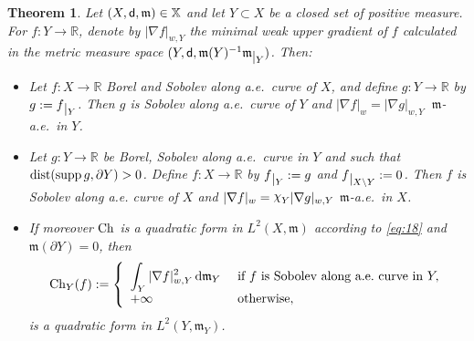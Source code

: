 \documentclass[reqno,11pt]{article}
\numberwithin{equation}{section}
\newcommand{\C}{\mathbb{C}}
\newcommand{\R}{\mathbb{R}}
\newcommand{\mm}{{\mbox{\boldmath$m$}}}
\newcommand{\sfd}{{\sf d}}
\newcommand{\supp}{\mathop{\rm supp}\nolimits}   %
\renewcommand{\d}{{\mathrm d}}
\newcommand{\restr}[1]{\lower3pt\hbox{$|_{#1}$}}
\newcommand{\nchi}{{\raise.3ex\hbox{$\chi$}}}
\newtheorem{theorem}{Theorem}[section]
\newcommand{\X}{\mathbb X}
\newcommand{\weakgrad}[1]{|\nabla #1|_w}                %
\renewcommand{\C}{{\rm Ch}}
\newcommand{\weakgrado}[2]{|\nabla #1|_{w,#2}}                %
\renewcommand{\mm}{\mathfrak m}
\begin{document}
\begin{theorem}\label{thm:gradristretti}
Let $(X,\sfd,\mm)\in \X$ and let $Y\subset X$ be a closed set of
positive measure. For $f:Y\to\R$, denote by $\weakgrado f{Y}$ the
minimal weak upper gradient of $f$ calculated in the metric measure
space $(Y,\sfd,\mm(Y)^{-1}\mm\restr{Y})$. Then:
\begin{itemize}
\item[(i)] Let $f: X\to\R$ Borel and Sobolev along a.e.~curve of $X$, and define $g:Y\to\R$ by
$g:=f\restr{Y}$. Then $g$ is Sobolev along a.e.~curve of $Y$ and
$\weakgrad f=\weakgrado{g}{Y}\ $ $\mm$-a.e.~in $Y$.
\item[(ii)] Let $g:Y\to\R$ be Borel, Sobolev along a.e.~curve in $Y$ and such that
${\rm dist}(\supp g,\partial Y)>0$. Define $f:X\to\R$ by $f\restr
Y:=g$ and $f\restr{X\setminus Y}:=0$. Then $f$ is Sobolev along a.e.
curve of $X$ and $\weakgrad f=\nchi_Y\weakgrado {g}Y$ $\mm$-a.e.~in
$X$.
\item[(iii)] If moreover $\C$ is a quadratic form in $L^2(X,\mm)$ according to
\eqref{eq:18} and $\mm(\partial Y)=0$, then
\[
\C_Y(f):=\left\{\begin{array}{ll}
\displaystyle{\int_Y\weakgrado f{Y}^2\,\d\mm_Y}&\textrm{ if }f\textrm{ is Sobolev along a.e.~curve in }Y,\\
+\infty&\textrm{ otherwise},
\end{array}
\right.
\]
is a quadratic form in $L^2(Y,\mm_Y)$.
\end{itemize}
\end{theorem}
\end{document}
